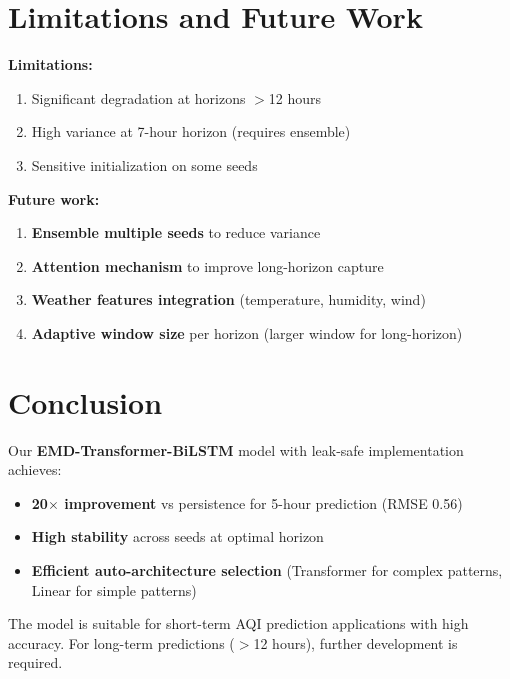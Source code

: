 \documentclass[11pt,a4paper]{article}
\begin{document}
\section{Limitations and Future Work}

\textbf{Limitations:}
\begin{enumerate}
    \item Significant degradation at horizons $>$12 hours
    \item High variance at 7-hour horizon (requires ensemble)
    \item Sensitive initialization on some seeds
\end{enumerate}

\textbf{Future work:}
\begin{enumerate}
    \item \textbf{Ensemble multiple seeds} to reduce variance
    \item \textbf{Attention mechanism} to improve long-horizon capture
    \item \textbf{Weather features integration} (temperature, humidity, wind)
    \item \textbf{Adaptive window size} per horizon (larger window for long-horizon)
\end{enumerate}

\section{Conclusion}

Our \textbf{EMD-Transformer-BiLSTM} model with leak-safe implementation achieves:
\begin{itemize}
    \item \textbf{20$\times$ improvement} vs persistence for 5-hour prediction (RMSE 0.56)
    \item \textbf{High stability} across seeds at optimal horizon
    \item \textbf{Efficient auto-architecture selection} (Transformer for complex patterns, Linear for simple patterns)
\end{itemize}

The model is suitable for short-term AQI prediction applications with high accuracy. For long-term predictions ($>$12 hours), further development is required.
\end{document}
